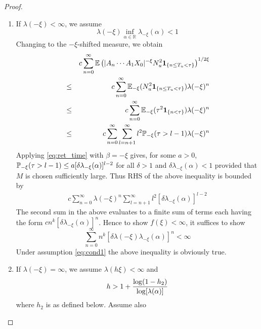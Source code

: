 \documentclass{article}
\theoremstyle{remark}
\begin{document}
\begin{proof}
  \begin{enumerate}
  \item If $\lambda(-\xi) < \infty$, we assume
    \begin{equation}
      \label{eq:cond1}
      \lambda(-\xi)
      \inf_{\alpha \in \mathbb R} \lambda_{-\xi}(\alpha) < 1
    \end{equation}
    Changing to the $-\xi$-shifted measure, we obtain
    \begin{eqnarray}
      &&
      c \sum_{n=0}^\infty
      \E \left(
        |A_n \cdots A_1 X_0|^{-\xi}
        N_u^2
        \1{n \leq T_u < \tau}        
      \right)^{1/2\xi} \\
      &\leq&
      c \sum_{n=0}^\infty
      \E_{-\xi} (N_u^2 \1{n \leq T_u < \tau})
      \lambda(-\xi)^n \\
      &\leq&
      c \sum_{n=0}^\infty
      \E_{-\xi} (\tau^2 \1{n < \tau})
      \lambda(-\xi)^n \\
      &\leq&
      c \sum_{n=0}^\infty
      \sum_{l=n+1}^\infty
      l^2 \P_{-\xi}(\tau > l-1)
      \lambda(-\xi)^n
    \end{eqnarray}
    Applying \eqref{eq:ret_time} with $\beta = -\xi$ gives, for some
    $a > 0$, $\P_{-\xi}(\tau > l-1) \leq a [\delta \lambda_{-\xi}(\alpha)]^{l-2}$
    for all $\delta > 1$ and $\delta \lambda_{-\xi}(\alpha) < 1$
    provided that $M$ is chosen sufficiently large. Thus RHS of the
    above inequality is bounded by
    \begin{eqnarray*}
      c \sum_{n=0}^\infty
      \lambda(-\xi)^n
      \sum_{l=n+1}^\infty
      l^2 [\delta \lambda_{-\xi}(\alpha)]^{l-2}
    \end{eqnarray*}
    The second sum in the above evaluates to a finite sum of terms
    each having the form $c n^k [\delta
    \lambda_{-\xi}(\alpha)]^n$. Hence to show $f(\xi) < \infty$, it
    suffices to show
    \begin{equation*}
      \sum_{n=0}^\infty
      n^k [\delta \lambda(-\xi) \lambda_{-\xi}(\alpha)]^n < \infty
    \end{equation*}
    Under assumption \eqref{eq:cond1} the above inequality is
    obviously true.
  \item If $\lambda(-\xi) = \infty$, we assume $\lambda(h\xi) <
    \infty$ and
    \begin{equation}
      \label{eq:cond2}
      h > 1 + {
        \log(1 - h_2)
        \over
        \log[\lambda(\alpha)]
      }
    \end{equation}
    where $h_2$ is as defined below. Assume also

\end{enumerate}
\end{proof}
\end{document}

